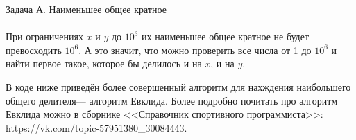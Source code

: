 {\large Задача А. Наименьшее общее кратное}
\\
\\
При ограничениях $x$ и $y$ до $10^3$ их наименьшее общее кратное не будет превосходить $10^6$. А это значит, что можно проверить все числа от 1 до $10^6$ и найти первое такое, которое бы делилось и на $x$, и на $y$.

В коде ниже приведён более совершенный алгоритм для нахждения наибольшего общего делителя--- алгоритм Евклида. Более подробно почитать про алгоритм Евклида можно в сборнике <<Справочник спортивного программиста>>: https://vk.com/topic-57951380\_30084443.
